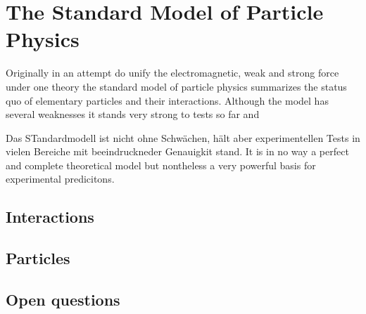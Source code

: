 \chapter{The Standard Model of Particle Physics}

Originally in an attempt do unify the electromagnetic, weak and strong force under one theory the standard model of particle physics summarizes the status quo of elementary particles and their interactions. Although the model has several weaknesses it stands very strong to tests so far and 

Das STandardmodell ist nicht ohne Schwächen, hält aber experimentellen Tests in vielen Bereiche mit beeindruckneder Genauigkit stand. It is in no way a perfect and complete theoretical model but nontheless a very powerful basis for experimental predicitons.

\section{Interactions}

\section{Particles}

\section{Open questions}
